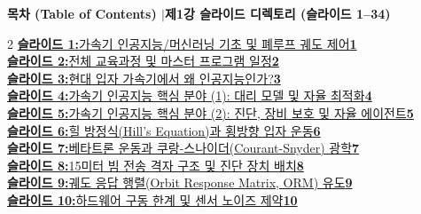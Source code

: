 \documentclass[11pt,a4paper]{article}
\begin{document}
\noindent\begin{tcolorbox}[colback=navy,colframe=navy,left=8pt,right=8pt,top=4pt,bottom=4pt,boxrule=0pt,arc=2pt]
{\large\bfseries\color{white}목차 (Table of Contents) \enspace$|$\enspace 제1강 슬라이드 디렉토리 (슬라이드 1--34)}
\end{tcolorbox}
\vspace{0.4em}

{\footnotesize
\begin{multicols}{2}
\noindent\hyperlink{slide.1}{\textbf{\color{primaryblue}슬라이드 1:}\enspace 가속기 인공지능/머신러닝 기초 및 폐루프 궤도 제어\enspace\dotfill\enspace\textbf{1}} \\[0.22em]
\noindent\hyperlink{slide.2}{\textbf{\color{primaryblue}슬라이드 2:}\enspace 전체 교육과정 및 마스터 프로그램 일정\enspace\dotfill\enspace\textbf{2}} \\[0.22em]
\noindent\hyperlink{slide.3}{\textbf{\color{primaryblue}슬라이드 3:}\enspace 현대 입자 가속기에서 왜 인공지능인가?\enspace\dotfill\enspace\textbf{3}} \\[0.22em]
\noindent\hyperlink{slide.4}{\textbf{\color{primaryblue}슬라이드 4:}\enspace 가속기 인공지능 핵심 분야 (1): 대리 모델 및 자율 최적화\enspace\dotfill\enspace\textbf{4}} \\[0.22em]
\noindent\hyperlink{slide.5}{\textbf{\color{primaryblue}슬라이드 5:}\enspace 가속기 인공지능 핵심 분야 (2): 진단, 장비 보호 및 자율 에이전트\enspace\dotfill\enspace\textbf{5}} \\[0.22em]
\noindent\hyperlink{slide.6}{\textbf{\color{primaryblue}슬라이드 6:}\enspace 힐 방정식(Hill's Equation)과 횡방향 입자 운동\enspace\dotfill\enspace\textbf{6}} \\[0.22em]
\noindent\hyperlink{slide.7}{\textbf{\color{primaryblue}슬라이드 7:}\enspace 베타트론 운동과 쿠랑-스나이더(Courant-Snyder) 광학\enspace\dotfill\enspace\textbf{7}} \\[0.22em]
\noindent\hyperlink{slide.8}{\textbf{\color{primaryblue}슬라이드 8:}\enspace 15미터 빔 전송 격자 구조 및 진단 장치 배치\enspace\dotfill\enspace\textbf{8}} \\[0.22em]
\noindent\hyperlink{slide.9}{\textbf{\color{primaryblue}슬라이드 9:}\enspace 궤도 응답 행렬(Orbit Response Matrix, ORM) 유도\enspace\dotfill\enspace\textbf{9}} \\[0.22em]
\noindent\hyperlink{slide.10}{\textbf{\color{primaryblue}슬라이드 10:}\enspace 하드웨어 구동 한계 및 센서 노이즈 제약\enspace\dotfill\enspace\textbf{10}} \\[0.22em]

\end{multicols}}
\end{document}

